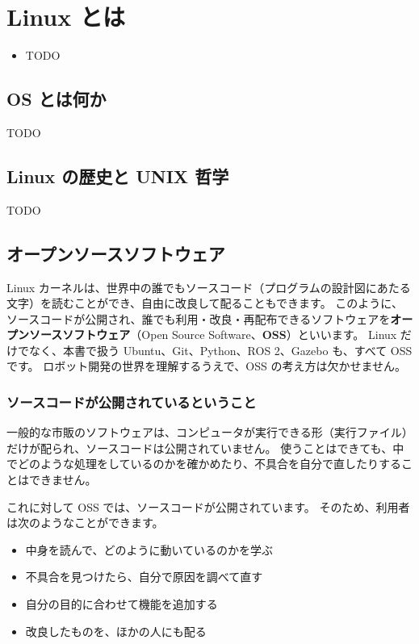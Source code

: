 \chapter{Linux とは}
\label{chap:what_is_linux}

\begin{goalbox}
  \begin{itemize}
    \item TODO
  \end{itemize}
\end{goalbox}

\section{OS とは何か}

TODO

\section{Linux の歴史と UNIX 哲学}

TODO

\section{オープンソースソフトウェア}
\label{sec:linux-oss}

Linux カーネルは、世界中の誰でもソースコード（プログラムの設計図にあたる文字）を読むことができ、自由に改良して配ることもできます。
このように、ソースコードが公開され、誰でも利用・改良・再配布できるソフトウェアを\textbf{オープンソースソフトウェア}（Open Source Software、\textbf{OSS}）といいます。
Linux だけでなく、本書で扱う Ubuntu、Git、Python、ROS 2、Gazebo も、すべて OSS です。
ロボット開発の世界を理解するうえで、OSS の考え方は欠かせません。

\subsection{ソースコードが公開されているということ}

一般的な市販のソフトウェアは、コンピュータが実行できる形（実行ファイル）だけが配られ、ソースコードは公開されていません。
使うことはできても、中でどのような処理をしているのかを確かめたり、不具合を自分で直したりすることはできません。

これに対して OSS では、ソースコードが公開されています。
そのため、利用者は次のようなことができます。

\begin{itemize}
  \item 中身を読んで、どのように動いているのかを学ぶ
  \item 不具合を見つけたら、自分で原因を調べて直す
  \item 自分の目的に合わせて機能を追加する
  \item 改良したものを、ほかの人にも配る
\end{itemize}

